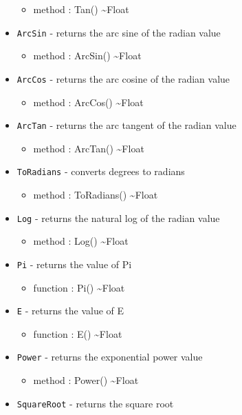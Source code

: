 \documentclass[11pt]{article}
\begin{document}
\begin{itemize}
\begin{itemize}
  \item method : Tan() \textasciitilde Float
  \end{itemize}
\item \texttt{ArcSin} - returns the arc sine of the radian value
  \begin{itemize}
  \item method : ArcSin() \textasciitilde Float
  \end{itemize}
\item \texttt{ArcCos} - returns the arc cosine of the radian value
  \begin{itemize}
  \item method : ArcCos() \textasciitilde Float
  \end{itemize}
\item \texttt{ArcTan} - returns the arc tangent of the radian value
  \begin{itemize}
  \item method : ArcTan() \textasciitilde Float
  \end{itemize}
\item \texttt{ToRadians} - converts degrees to radians
  \begin{itemize}
  \item method : ToRadians() \textasciitilde Float
  \end{itemize}
\item \texttt{Log} - returns the natural log of the radian value
  \begin{itemize}
  \item method : Log() \textasciitilde Float
  \end{itemize}
\item \texttt{Pi} - returns the value of Pi
  \begin{itemize}
  \item function : Pi() \textasciitilde Float
  \end{itemize}
\item \texttt{E} - returns the value of E
  \begin{itemize}
  \item function : E() \textasciitilde Float
  \end{itemize}
\item \texttt{Power} - returns the exponential power value
  \begin{itemize}
  \item method : Power() \textasciitilde Float
  \end{itemize}
\item \texttt{SquareRoot} - returns the square root

\end{itemize}
\end{document}
